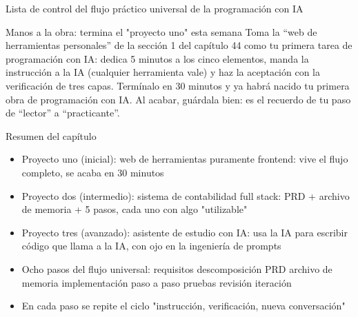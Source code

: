\begin{center}\small\color{gray}Lista de control del flujo práctico universal de la programación con IA\end{center}

\begin{tcbpractice}{Manos a la obra: termina el "proyecto uno" esta semana}
Toma la “web de herramientas personales” de la sección 1 del capítulo 44 como tu primera tarea de programación con IA: dedica 5 minutos a los cinco elementos, manda la instrucción a la IA (cualquier herramienta vale) y haz la aceptación con la verificación de tres capas. Termínalo en 30 minutos y ya habrá nacido tu primera obra de programación con IA. Al acabar, guárdala bien: es el recuerdo de tu paso de “lector” a “practicante”.

\end{tcbpractice}

\begin{tcbsummary}{Resumen del capítulo}
\begin{itemize}
  \item Proyecto uno (inicial): web de herramientas puramente frontend: vive el flujo completo, se acaba en 30 minutos
  \item Proyecto dos (intermedio): sistema de contabilidad full stack: PRD + archivo de memoria + 5 pasos, cada uno con algo "utilizable"
  \item Proyecto tres (avanzado): asistente de estudio con IA: usa la IA para escribir código que llama a la IA, con ojo en la ingeniería de prompts
  \item Ocho pasos del flujo universal: requisitos descomposición PRD archivo de memoria implementación paso a paso pruebas revisión iteración
  \item En cada paso se repite el ciclo "instrucción, verificación, nueva conversación"
\end{itemize}

\end{tcbsummary}
